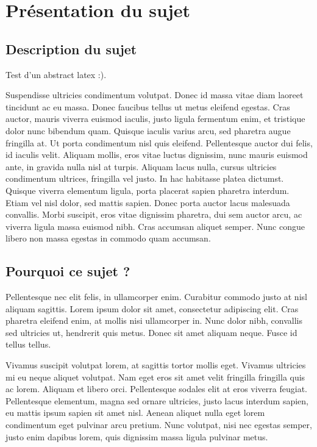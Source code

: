 \chapter{Présentation du sujet}
\minitoc

\section{Description du sujet}

\textrm{Test d'un abstract latex :).}


Suspendisse ultricies condimentum volutpat. Donec id massa vitae diam laoreet tincidunt ac eu massa. Donec faucibus tellus ut metus eleifend egestas. Cras auctor, mauris viverra euismod iaculis, justo ligula fermentum enim, et tristique dolor nunc bibendum quam. Quisque iaculis varius arcu, sed pharetra augue fringilla at. Ut porta condimentum nisl quis eleifend. Pellentesque auctor dui felis, id iaculis velit. Aliquam mollis, eros vitae luctus dignissim, nunc mauris euismod ante, in gravida nulla nisl at turpis. Aliquam lacus nulla, cursus ultricies condimentum ultrices, fringilla vel justo. In hac habitasse platea dictumst. Quisque viverra elementum ligula, porta placerat sapien pharetra interdum. Etiam vel nisl dolor, sed mattis sapien. Donec porta auctor lacus malesuada convallis. Morbi suscipit, eros vitae dignissim pharetra, dui sem auctor arcu, ac viverra ligula massa euismod nibh. Cras accumsan aliquet semper. Nunc congue libero non massa egestas in commodo quam accumsan. 

\section{Pourquoi ce sujet ?}

Pellentesque nec elit felis, in ullamcorper enim. Curabitur commodo justo at nisl aliquam sagittis. Lorem ipsum dolor sit amet, consectetur adipiscing elit. Cras pharetra eleifend enim, at mollis nisi ullamcorper in. Nunc dolor nibh, convallis sed ultricies ut, hendrerit quis metus. Donec sit amet aliquam neque. Fusce id tellus tellus. 

Vivamus suscipit volutpat lorem, at sagittis tortor mollis eget. Vivamus ultricies mi eu neque aliquet volutpat. Nam eget eros sit amet velit fringilla fringilla quis ac lorem. Aliquam et libero orci. Pellentesque sodales elit at eros viverra feugiat. Pellentesque elementum, magna sed ornare ultricies, justo lacus interdum sapien, eu mattis ipsum sapien sit amet nisl. Aenean aliquet nulla eget lorem condimentum eget pulvinar arcu pretium. Nunc volutpat, nisi nec egestas semper, justo enim dapibus lorem, quis dignissim massa ligula pulvinar metus. 

